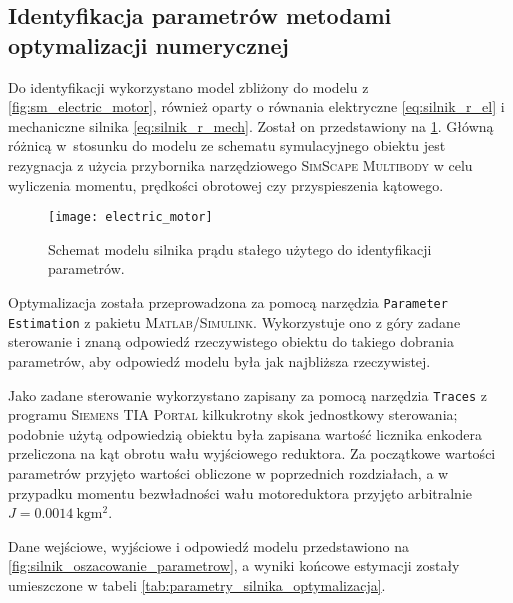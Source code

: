 \subsection{Identyfikacja parametrów metodami optymalizacji numerycznej}
\label{subsec:ch5_identyfikacja_parametrow_metodami_optymalizacji_numerycznej}

Do identyfikacji wykorzystano model zbliżony do modelu z \cref{fig:sm_electric_motor}, również oparty o równania elektryczne \eqref{eq:silnik_r_el} i mechaniczne silnika \eqref{eq:silnik_r_mech}. Został on przedstawiony na \cref{fig:electric_motor}. Główną różnicą w~stosunku do modelu ze schematu symulacyjnego obiektu jest rezygnacja z użycia przybornika narzędziowego \textsc{SimScape Multibody} w celu wyliczenia momentu, prędkości obrotowej czy przyspieszenia kątowego.

\begin{figure}[h]
    \centering
    \texttt{[image: electric\_motor]}
    \caption{Schemat modelu silnika prądu stałego użytego do identyfikacji parametrów.}
    \label{fig:electric_motor}
\end{figure}

Optymalizacja została przeprowadzona za pomocą narzędzia \texttt{Parameter Estimation} z pakietu \textsc{Matlab/Simulink}. Wykorzystuje ono z góry zadane sterowanie i znaną odpowiedź rzeczywistego obiektu do takiego dobrania parametrów, aby odpowiedź modelu była jak najbliższa rzeczywistej.

Jako zadane sterowanie wykorzystano zapisany za pomocą narzędzia \texttt{Traces} z programu \textsc{Siemens TIA Portal} kilkukrotny skok jednostkowy sterowania; podobnie użytą odpowiedzią obiektu była zapisana wartość licznika enkodera przeliczona na kąt obrotu wału wyjściowego reduktora. Za początkowe wartości parametrów przyjęto wartości obliczone w poprzednich rozdziałach, a w przypadku momentu bezwładności wału motoreduktora przyjęto arbitralnie $J = \SI{0,0014}{\kilogram\meter\squared}$.

Dane wejściowe, wyjściowe i odpowiedź modelu przedstawiono na \cref{fig:silnik_oszacowanie_parametrow}, a wyniki końcowe estymacji zostały umieszczone w tabeli \ref{tab:parametry_silnika_optymalizacja}.

